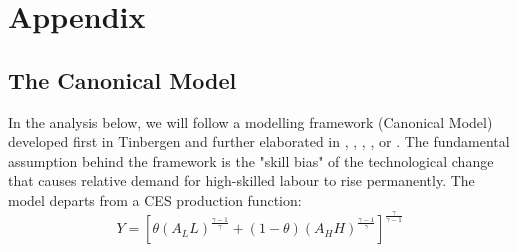\documentclass[11pt]{article}
\begin{document}
















\newpage
\appendix
\section{Appendix}
\setcounter{table}{0}
\renewcommand{\thetable}{A\arabic{table}}
\renewcommand{\thefigure}{A\arabic{figure}}
\setcounter{figure}{0}

\subsection{The Canonical Model}\label{canonical}
In the analysis below, we will follow a modelling framework (Canonical Model) developed first in Tinbergen and further elaborated in \citet{katz1992changes}, \citet{goldin2010race}, \citet{card2001can}, \citet{acemoglu2011skills}, or \citet{glitz2021skill}.
The fundamental assumption behind the framework is the "skill bias" of the technological change that causes relative demand for high-skilled labour to rise permanently.
The model departs from a CES production function:
\begin{equation}
\label{eqn:STBC_prod_function}
Y = [\theta(A_{L}L)^{\frac{\gamma - 1}{\gamma}} + (1 - \theta)(A_{H}H)^{\frac{\gamma - 1}{\gamma}}]^\frac{\gamma}{\gamma - 1}
\end{equation}
\end{document}
